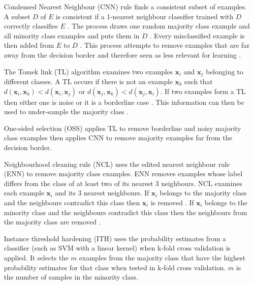 \documentclass{sig-alternate-05-2015}
\begin{document}
	Condensed Nearest Neighbour (CNN) rule \cite{1056066} finds a consistent subset of examples. A subset $D$ of $E$ is consistent if a 1-nearest neighbour classifier trained with $D$ correctly classifies $E$ \cite{Batista:2004:SBS:1007730.1007735}. The process draws one random majority class example and all minority class examples and puts them in $D$ \cite{Batista:2004:SBS:1007730.1007735}. Every misclassified example is then added from $E$ to $D$ \cite{Batista:2004:SBS:1007730.1007735}. This process attempts to remove examples that are far away from the decision border and therefore seen as less relevant for learning \cite{Batista:2004:SBS:1007730.1007735}.
	
	The Tomek link (TL) algorithm \cite{4309452} examines two examples $\textbf{x}_i$ and $\textbf{x}_j$ belonging to different classes. A TL occurs if there is not an example $\textbf{x}_k$ such that $d(\textbf{x}_i, \textbf{x}_k) < d(\textbf{x}_i, \textbf{x}_j)$ or $d(\textbf{x}_j, \textbf{x}_k) < d(\textbf{x}_j, \textbf{x}_i)$. If two examples form a TL then either one is noise or it is a borderline case \cite{Batista:2004:SBS:1007730.1007735}. This information can then be used to under-sample the majority class \cite{Batista:2004:SBS:1007730.1007735}.
	
	One-sided selection (OSS) \cite{Kubat97addressingthe} applies TL to remove borderline and noisy majority class examples then applies CNN to remove majority examples far from the decision border.
	
	Neighbourhood cleaning rule (NCL) \cite{Laurikkala:2001:IID:648155.757340} uses the edited nearest neighbour rule (ENN) to remove majority class examples. ENN removes examples whose label differs from the class of at least two of its nearest 3 neighbours. NCL examines each example $\textbf{x}_i$ and its 3 nearest neighbours. If $\textbf{x}_i$ belongs to the majority class and the neighbours contradict this class then $\textbf{x}_i$ is removed \cite{Batista:2004:SBS:1007730.1007735}. If $\textbf{x}_i$ belongs to the minority class and the neighbours contradict this class then the neighbours from the majority class are removed \cite{Batista:2004:SBS:1007730.1007735}.
	
	Instance threshold hardening (ITH) \cite{Smith:2014:ILA:2843614.2843686} uses the probability estimates from a classifier (such as SVM with a linear kernel) when k-fold cross validation is applied. It selects the $m$ examples from the majority class that have the highest probability estimates for that class when tested in k-fold cross validation. $m$ is the number of samples in the minority class.
	
\end{document}
